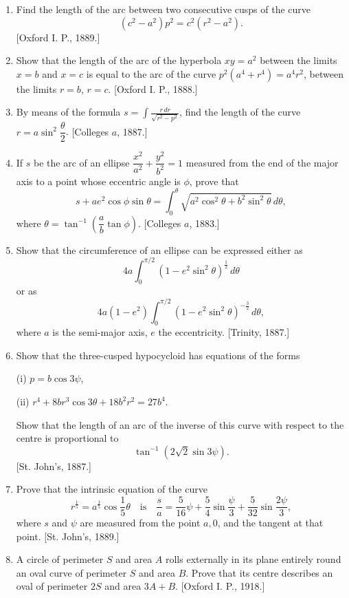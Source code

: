 \documentclass[11pt, a4paper]{article}
\newcommand{\source}[1]{\hfill\textnormal{[#1]}}
\begin{document}
\begin{enumerate}[leftmargin=2em]
\item Find the length of the arc between two consecutive cusps of the curve
\[
(c^2-a^2)p^2=c^2(r^2-a^2).
\]
\source{Oxford I. P., 1889.}

\item Show that the length of the arc of the hyperbola $xy=a^2$ between the limits $x=b$ and $x=c$ is equal to the arc of the curve $p^2(a^4+r^4)=a^4r^2$, between the limits $r=b$, $r=c$. \source{Oxford I. P., 1888.}

\item By means of the formula $s=\displaystyle\int\frac{r\,dr}{\sqrt{r^2-p^2}}$, find the length of the curve $r=a\sin^2\dfrac{\theta}{2}$. \source{Colleges $a$, 1887.}

\item If $s$ be the arc of an ellipse $\dfrac{x^2}{a^2}+\dfrac{y^2}{b^2}=1$ measured from the end of the major axis to a point whose eccentric angle is $\phi$, prove that
\[
s+ae^2\cos\phi\sin\theta=\int_0^\theta\sqrt{a^2\cos^2\theta+b^2\sin^2\theta}\,d\theta,
\]
where $\theta=\tan^{-1}\left(\dfrac{a}{b}\tan\phi\right)$. \source{Colleges $a$, 1883.}

\item Show that the circumference of an ellipse can be expressed either as
\[
4a\int_0^{\pi/2}(1-e^2\sin^2\theta)^{\frac12}\,d\theta
\]
or as
\[
4a(1-e^2)\int_0^{\pi/2}(1-e^2\sin^2\theta)^{-\frac32}\,d\theta,
\]
where $a$ is the semi-major axis, $e$ the eccentricity. \source{Trinity, 1887.}

\item Show that the three-cusped hypocycloid has equations of the forms

(i) $p=b\cos3\psi$,

(ii) $r^4+8br^3\cos3\theta+18b^2r^2=27b^4$.

Show that the length of an arc of the inverse of this curve with respect to the centre is proportional to
\[
\tan^{-1}(2\sqrt2\sin3\psi).
\]
\source{St. John's, 1887.}

\item Prove that the intrinsic equation of the curve
\[
r^{\frac15}=a^{\frac15}\cos\frac15\theta\quad\text{is}\quad\frac{s}{a}=\frac{5}{16}\psi+\frac54\sin\frac{\psi}{3}+\frac{5}{32}\sin\frac{2\psi}{3},
\]
where $s$ and $\psi$ are measured from the point $a,0$, and the tangent at that point. \source{St. John's, 1889.}

\item A circle of perimeter $S$ and area $A$ rolls externally in its plane entirely round an oval curve of perimeter $S$ and area $B$. Prove that its centre describes an oval of perimeter $2S$ and area $3A+B$. \source{Oxford I. P., 1918.}


\end{enumerate}
\end{document}
